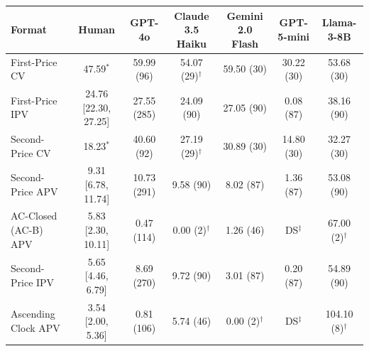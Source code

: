 \begin{tabular}{lcccccc}
\toprule
Format & Human & GPT-4o & Claude 3.5 Haiku & Gemini 2.0 Flash & GPT-5-mini & Llama-3-8B \\
\midrule
First-Price CV & 47.59$^{\ast}$ & 59.99 {\scriptsize (96)} & 54.07 {\scriptsize (29)}$^{\dagger}$ & 59.50 {\scriptsize (30)} & 30.22 {\scriptsize (30)} & 53.68 {\scriptsize (30)} \\
First-Price IPV & 24.76 [22.30, 27.25] & 27.55 {\scriptsize (285)} & 24.09 {\scriptsize (90)} & 27.05 {\scriptsize (90)} & 0.08 {\scriptsize (87)} & 38.16 {\scriptsize (90)} \\
Second-Price CV & 18.23$^{\ast}$ & 40.60 {\scriptsize (92)} & 27.19 {\scriptsize (29)}$^{\dagger}$ & 30.89 {\scriptsize (30)} & 14.80 {\scriptsize (30)} & 32.27 {\scriptsize (30)} \\
Second-Price APV & 9.31 [6.78, 11.74] & 10.73 {\scriptsize (291)} & 9.58 {\scriptsize (90)} & 8.02 {\scriptsize (87)} & 1.36 {\scriptsize (87)} & 53.08 {\scriptsize (90)} \\
AC-Closed (AC-B) APV & 5.83 [2.30, 10.11] & 0.47 {\scriptsize (114)} & 0.00 {\scriptsize (2)}$^{\dagger}$ & 1.26 {\scriptsize (46)} & DS$^{\ddagger}$ & 67.00 {\scriptsize (2)}$^{\dagger}$ \\
Second-Price IPV & 5.65 [4.46, 6.79] & 8.69 {\scriptsize (270)} & 9.72 {\scriptsize (90)} & 3.01 {\scriptsize (87)} & 0.20 {\scriptsize (87)} & 54.89 {\scriptsize (90)} \\
Ascending Clock APV & 3.54 [2.00, 5.36] & 0.81 {\scriptsize (106)} & 5.74 {\scriptsize (46)} & 0.00 {\scriptsize (2)}$^{\dagger}$ & DS$^{\ddagger}$ & 104.10 {\scriptsize (8)}$^{\dagger}$ \\
\bottomrule
\end{tabular}
